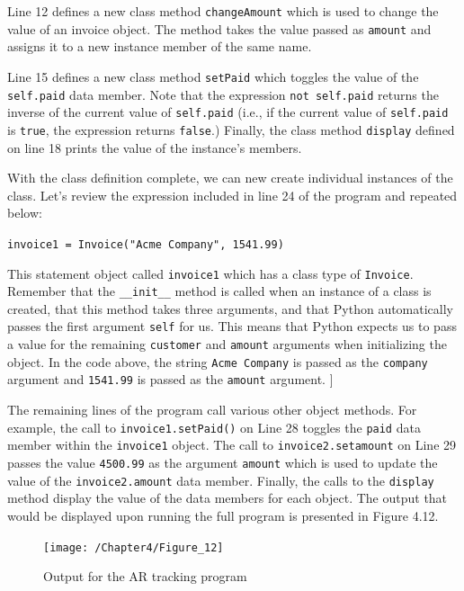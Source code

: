 \documentclass{book}
\begin{document}
Line 12 defines a new class method \texttt{changeAmount} which is used to change the value of an invoice object. The method takes the value passed as \texttt{amount} and assigns it to a new instance member of the same name. 

Line 15 defines a new class method \texttt{setPaid} which toggles the value of the \texttt{self.paid} data member. Note that the expression \texttt{not self.paid} returns the inverse of the current value of \texttt{self.paid} (i.e., if the current value of \texttt{self.paid} is \texttt{true}, the expression returns \texttt{false}.) Finally, the class method \texttt{display} defined on line 18 prints the value of the instance's members.

With the class definition complete, we can new create individual instances of the class. Let's review the expression included in line 24 of the program and repeated below:

\texttt{invoice1 = Invoice("Acme Company", 1541.99)}

This statement object called \texttt{invoice1} which has a class type of \texttt{Invoice}. Remember that the  \texttt{\_\_init\_\_} method is called when an instance of a class is created, that this method takes three arguments, and that Python automatically passes the first argument \texttt{self} for us. This means that Python expects us to pass a value for the remaining \texttt{customer} and \texttt{amount} arguments when initializing the object. In the code above, the string \texttt{Acme Company} is passed as the \texttt{company} argument and \texttt{1541.99} is passed as the \texttt{amount} argument. ]

The remaining lines of the program call various other object methods. For example, the call to \texttt{invoice1.setPaid()} on Line 28 toggles the \texttt{paid} data member within the \texttt{invoice1} object. The call to \texttt{invoice2.setamount} on Line 29 passes the value \texttt{4500.99} as the argument \texttt{amount} which is used to update the value of the \texttt{invoice2.amount} data member. Finally, the calls to the \texttt{display} method display the value of the data members for each object. The output that would be displayed upon running the full program is presented in Figure 4.12.

\begin{figure}[h]
	\caption{Output for the AR tracking program}
	\centering\texttt{[image: /Chapter4/Figure\_12]}
\end{figure}
\end{document}
